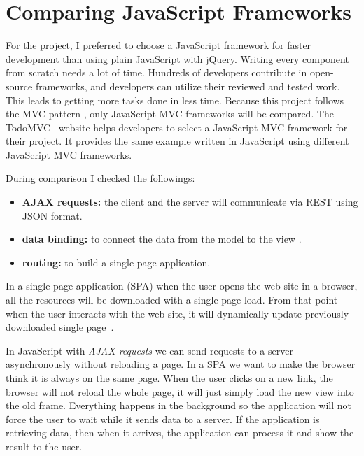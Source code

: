 \chapter{Comparing JavaScript Frameworks}
\label{comparing-frameworks}

For the project, I preferred to choose a JavaScript framework for faster development than using plain JavaScript with jQuery. Writing every component from scratch needs a lot of time. Hundreds of developers contribute in open-source frameworks, and developers can utilize their reviewed and tested work. This leads to getting more tasks done in less time. Because this project follows the MVC pattern , only JavaScript MVC frameworks will be compared. The TodoMVC~\cite{TodoMVC} website helps developers to select a JavaScript MVC framework for their project. It provides the same example written in JavaScript using different JavaScript MVC frameworks.

During comparison I checked the followings:
\begin{itemize}
	\item \textbf{AJAX requests:} the client and the server  will communicate via REST using JSON format.
	\item \textbf{data binding:} to connect the data from the model to the view .
	\item \textbf{routing:} to build a single-page application.
\end{itemize}


In a single-page application (SPA) when the user opens the web site in a browser, all the resources will be downloaded with a single page load. From that point when the user interacts with the web site, it will dynamically update previously downloaded single page~\cite{SPA}.

In JavaScript with \emph{AJAX requests} we can send requests to a server asynchronously without reloading a page. In a SPA we want to make the browser think it is always on the same page. When the user clicks on a new link, the browser will not reload the whole page, it will just simply load the new view into the old frame. Everything happens in the background so the application will not force the user to wait while it sends data to a server. If the application is retrieving data, then when it arrives, the application can process it and show the result to the user.

